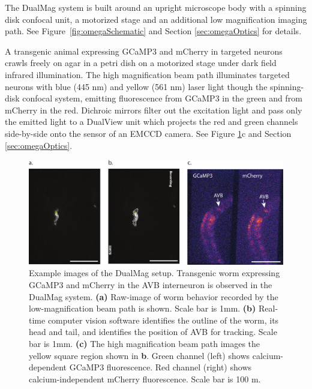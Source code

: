 The DualMag system is built around an upright microscope body with a spinning disk confocal unit, a motorized stage and an additional low magnification imaging path. See Figure~\ref{fig:omegaSchematic} and Section \ref{sec:omegaOptics} for details.

A transgenic animal  expressing GCaMP3 and mCherry in targeted neurons crawls freely on agar in a petri dish on a motorized stage under dark field infrared illumination. The high magnification beam path illuminates targeted neurons with  blue (445 nm) and yellow (561 nm) laser light though the spinning-disk confocal system, emitting fluorescence from GCaMP3 in the green and from mCherry in the red. Dichroic mirrors filter out the excitation light and pass only the emitted light to a DualView unit which projects the red and green channels side-by-side onto the sensor of an  EMCCD camera. See Figure \ref{fig:omegaSampleImages}c and Section \ref{sec:omegaOptics}. 


\begin{figure}  %
\includegraphics[width=\textwidth]{figures/omegaDualMagImagesWithScale}
\caption[Example images from the DualMag setup.]{Example images of the DualMag setup. Transgenic worm expressing GCaMP3 and mCherry in the AVB interneuron is observed in the DualMag system. \textbf{(a)} Raw-image of worm behavior recorded by the low-magnification beam path is shown. Scale bar is 1mm.  \textbf{(b)} Real-time computer vision software identifies the outline of the worm, its head and tail, and identifies the position of AVB for tracking. Scale bar is 1mm. \textbf{(c)} The high magnification beam path images the yellow square region shown in \textbf{b}. Green channel (left) shows calcium-dependent GCaMP3 fluorescence. Red channel (right) shows calcium-independent mCherry fluorescence. Scale bar is 100 \textmu m.
\label{fig:omegaSampleImages}}
\end{figure}

